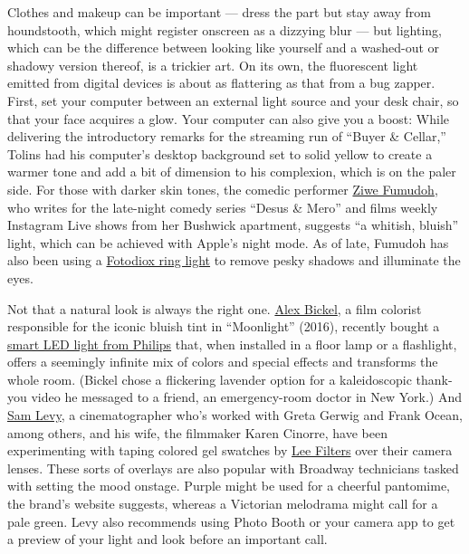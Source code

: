 Clothes and makeup can be important --- dress the part but stay away
from houndstooth, which might register onscreen as a dizzying blur ---
but lighting, which can be the difference between looking like yourself
and a washed-out or shadowy version thereof, is a trickier art. On its
own, the fluorescent light emitted from digital devices is about as
flattering as that from a bug zapper. First, set your computer between
an external light source and your desk chair, so that your face acquires
a glow. Your computer can also give you a boost: While delivering the
introductory remarks for the streaming run of ``Buyer \& Cellar,''
Tolins had his computer's desktop background set to solid yellow to
create a warmer tone and add a bit of dimension to his complexion, which
is on the paler side. For those with darker skin tones, the comedic
performer \href{https://www.instagram.com/ziwef/?hl=en}{Ziwe Fumudoh},
who writes for the late-night comedy series ``Desus \& Mero'' and films
weekly Instagram Live shows from her Bushwick apartment, suggests ``a
whitish, bluish'' light, which can be achieved with Apple's night mode.
As of late, Fumudoh has also been using a
\href{https://fotodioxpro.com/products/vlog-led-ringlight}{Fotodiox ring
light} to remove pesky shadows and illuminate the eyes.

Not that a natural look is always the right one.
\href{http://www.alexbickel.com/}{Alex Bickel}, a film colorist
responsible for the iconic bluish tint in ``Moonlight'' (2016), recently
bought a
\href{https://www.usa.lighting.philips.com/consumer/smart-wifi-led}{smart
LED light from Philips} that, when installed in a floor lamp or a
flashlight, offers a seemingly infinite mix of colors and special
effects and transforms the whole room. (Bickel chose a flickering
lavender option for a kaleidoscopic thank-you video he messaged to a
friend, an emergency-room doctor in New York.) And
\href{http://samlevydp.com/}{Sam Levy}, a cinematographer who's worked
with Greta Gerwig and Frank Ocean, among others, and his wife, the
filmmaker Karen Cinorre, have been experimenting with taping colored gel
swatches by
\href{https://www.leefilters.com/lighting/colour-list.html}{Lee Filters}
over their camera lenses. These sorts of overlays are also popular with
Broadway technicians tasked with setting the mood onstage. Purple might
be used for a cheerful pantomime, the brand's website suggests, whereas
a Victorian melodrama might call for a pale green. Levy also recommends
using Photo Booth or your camera app to get a preview of your light and
look before an important call.

